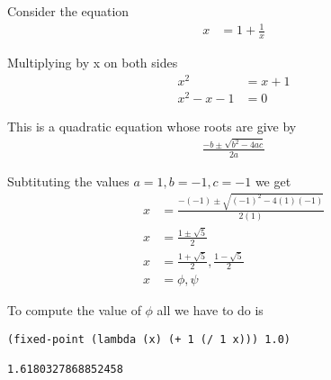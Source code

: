 \documentclass[a4paper,12pt]{article}
\begin{document}
\lstset{
language=Lisp,
basicstyle=\ttfamily,
}

Consider the equation
\begin{align}
    x &= 1 + \frac{1}{x}
\end{align}

Multiplying by x on both sides
\begin{align}
    x^2 &= x + 1 \\
    x^2 -x - 1 & = 0
\end{align}

This is a quadratic equation whose roots are give by 
\begin{align}
\frac{-b \pm \sqrt{b^2 - 4ac}}{2a}
\end{align}

Subtituting the values $a=1, b=-1, c=-1$ we get
\begin{align}
    x &= \frac{-(-1) \pm \sqrt{(-1)^2 - 4(1)(-1)}}{2(1)} \\
    x & = \frac{1 \pm \sqrt{5}}{2} \\
    x & = \frac{1 + \sqrt{5}}{2}, \frac{1 - \sqrt{5}}{2} \\ 
    x & = \phi, \psi
\end{align}

\bigskip To compute the value of $\phi$ all we have to do is

\begin{lstlisting}
(fixed-point (lambda (x) (+ 1 (/ 1 x))) 1.0)

1.6180327868852458
\end{lstlisting}
\end{document}
